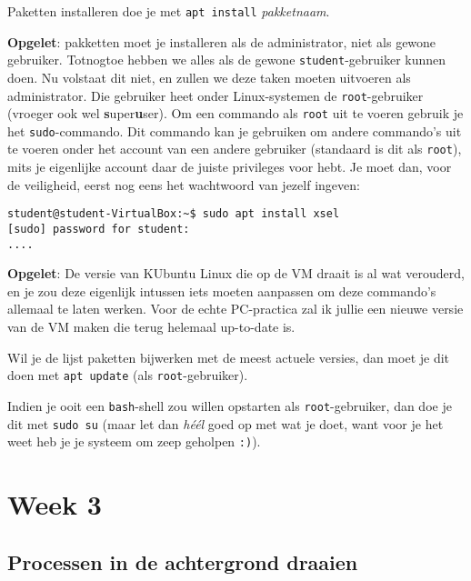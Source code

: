 \documentclass[a4paper,twoside,openany]{memoir}
\begin{document}
Paketten installeren doe je met \verb!apt install! \emph{pakketnaam}.

\textbf{Opgelet}: pakketten moet je installeren als de administrator, niet als
gewone gebruiker. Totnogtoe hebben we alles als de gewone
\verb!student!-gebruiker kunnen doen. Nu volstaat dit niet, en zullen we deze
taken moeten uitvoeren als administrator. Die gebruiker heet onder
Linux-systemen de \verb!root!-gebruiker (vroeger ook wel
\textbf{s}uper\textbf{u}ser). Om een commando als \verb!root! uit te voeren
gebruik je het \verb!sudo!-commando. Dit commando kan je gebruiken om andere
commando's uit te voeren onder het account van een andere gebruiker (standaard
is dit als \verb!root!), mits je eigenlijke account daar de juiste privileges
voor hebt. Je moet dan, voor de veiligheid, eerst nog eens het wachtwoord van
jezelf ingeven:

\begin{verbatim}
student@student-VirtualBox:~$ sudo apt install xsel
[sudo] password for student: 
....
\end{verbatim}

\textbf{Opgelet}: De versie van KUbuntu Linux die op de VM draait is al wat verouderd,
en je zou deze eigenlijk intussen iets moeten aanpassen om deze commando's allemaal te
laten werken. Voor de echte PC-practica zal ik jullie een nieuwe versie van de VM
maken die terug helemaal up-to-date is.

Wil je de lijst paketten bijwerken met de meest actuele versies, dan moet je dit
doen met \verb!apt update! (als \verb!root!-gebruiker).

Indien je ooit een \verb!bash!-shell zou willen opstarten als
\verb!root!-gebruiker, dan doe je dit met \verb!sudo su! (maar let dan
\emph{h\'e\'el} goed op met wat je doet, want voor je het weet heb je je systeem
om zeep geholpen \verb!:)!).

\part{Week 3}

\chapter{Processen in de achtergrond draaien}
\end{document}
